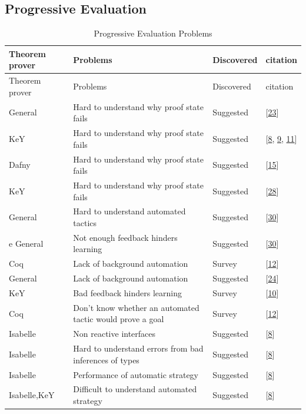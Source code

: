 \documentclass[
]{article}
\begin{document}
\hypertarget{progressive-evaluation-1}{%
\subsection{Progressive Evaluation}\label{progressive-evaluation-1}}

\hypertarget{tbl:progressive_evaluation}{}
\begin{longtable}[]{@{}llll@{}}
\caption{\label{tbl:progressive_evaluation}Progressive Evaluation
Problems}\tabularnewline
\toprule
Theorem prover & Problems & Discovered & citation \\
\midrule
\endfirsthead
\toprule
Theorem prover & Problems & Discovered & citation \\
\midrule
\endhead
General & Hard to understand why proof state fails & Suggested &
{[}\protect\hyperlink{ref-hentschel_interactive_2016}{23}{]} \\
KeY & Hard to understand why proof state fails & Suggested &
{[}\protect\hyperlink{ref-beckert_usability_2015}{8},
\protect\hyperlink{ref-beckert_interaction_2017}{9},
\protect\hyperlink{ref-beckert_interactive_2015}{11}{]} \\
Dafny & Hard to understand why proof state fails & Suggested &
{[}\protect\hyperlink{ref-grebing_seamless_2020}{15}{]} \\
KeY & Hard to understand why proof state fails & Suggested &
{[}\protect\hyperlink{ref-lin_understanding_2016}{28}{]} \\
General & Hard to understand automated tactics & Suggested &
{[}\protect\hyperlink{ref-mitsch_keymaera_2017}{30}{]} \\
e General & Not enough feedback hinders learning & Suggested &
{[}\protect\hyperlink{ref-mitsch_keymaera_2017}{30}{]} \\
Coq & Lack of background automation & Survey &
{[}\protect\hyperlink{ref-berman_development_2014}{12}{]} \\
General & Lack of background automation & Suggested &
{[}\protect\hyperlink{ref-hunter_agent-based_2005}{24}{]} \\
KeY & Bad feedback hinders learning & Survey &
{[}\protect\hyperlink{ref-beckert_evaluating_2012}{10}{]} \\
Coq & Don't know whether an automated tactic would prove a goal & Survey
& {[}\protect\hyperlink{ref-berman_development_2014}{12}{]} \\
Isabelle & Non reactive interfaces & Suggested &
{[}\protect\hyperlink{ref-beckert_usability_2015}{8}{]} \\
Isabelle & Hard to understand errors from bad inferences of types &
Suggested & {[}\protect\hyperlink{ref-beckert_usability_2015}{8}{]} \\
Isabelle & Performance of automatic strategy & Suggested &
{[}\protect\hyperlink{ref-beckert_usability_2015}{8}{]} \\
Isabelle,KeY & Difficult to understand automated strategy & Suggested &
{[}\protect\hyperlink{ref-beckert_usability_2015}{8}{]} \\
\bottomrule
\end{longtable}
\end{document}
